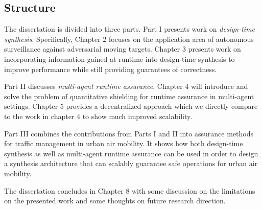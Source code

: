 \subsection{Structure}

The dissertation is divided into three parts. Part I presents work on \emph{design-time synthesis}. Specifically, Chapter 2 focuses on the application area of autonomous surveillance against adversarial moving targets. Chapter 3 presents work on incorporating information gained at runtime into design-time synthesis to improve performance while still providing guarantees of correctness. 

Part II discusses \emph{multi-agent runtime assurance}. Chapter 4 will introduce and solve the problem of quantitative shielding for runtime assurance in multi-agent settings. Chapter 5 provides a decentralized approach which we directly compare to the work in chapter 4 to show much improved scalability. 

Part III combines the contributions from Parts I and II into assurance methods for traffic management in urban air mobility. It shows how both design-time synthesis as well as multi-agent runtime assurance can be used in order to design a synthesis architecture that can scalably guarantee safe operations for urban air mobility. 

The dissertation concludes in Chapter 8 with some discussion on the limitations on the presented work and some thoughts on future research direction. 



